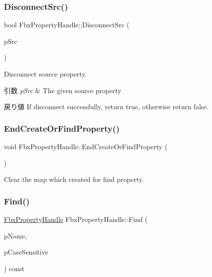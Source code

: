 \subsubsection{\texorpdfstring{Disconnect\+Src()}{DisconnectSrc()}}
{\footnotesize\ttfamily bool Fbx\+Property\+Handle\+::\+Disconnect\+Src (\begin{DoxyParamCaption}\item[{const \hyperlink{class_fbx_property_handle}{Fbx\+Property\+Handle} \&}]{p\+Src }\end{DoxyParamCaption})}

Disconnect source property. 
\begin{DoxyParams}{引数}
{\em p\+Src} & The given source property \\
\hline
\end{DoxyParams}
\begin{DoxyReturn}{戻り値}
If disconnect successfully, return true, otherwise return false. 
\end{DoxyReturn}
\mbox{\label{class_fbx_property_handle_a05f9bc5dcbb93bbde02ffc6c7b640632}} 
\subsubsection{\texorpdfstring{End\+Create\+Or\+Find\+Property()}{EndCreateOrFindProperty()}}
{\footnotesize\ttfamily void Fbx\+Property\+Handle\+::\+End\+Create\+Or\+Find\+Property (\begin{DoxyParamCaption}{ }\end{DoxyParamCaption})}



Clear the map which created for find property. 

\mbox{\label{class_fbx_property_handle_a51b81ef0ee996b87dd832c6f99122437}} 
\subsubsection{\texorpdfstring{Find()}{Find()}\hspace{0.1cm}{\footnotesize\ttfamily [1/4]}}
{\footnotesize\ttfamily \hyperlink{class_fbx_property_handle}{Fbx\+Property\+Handle} Fbx\+Property\+Handle\+::\+Find (\begin{DoxyParamCaption}\item[{const char $\ast$}]{p\+Name,  }\item[{bool}]{p\+Case\+Sensitive }\end{DoxyParamCaption}) const}

